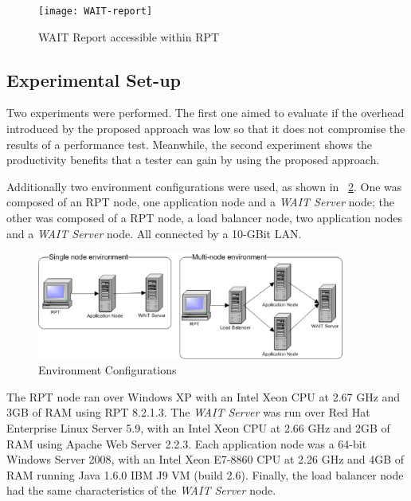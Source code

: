 \documentclass[runningheads,a4paper]{llncs}
\begin{document}

\begin{figure}[!h]
\centering
\texttt{[image: WAIT-report]}
\caption{WAIT Report accessible within RPT}
\label{fig_report}
\end{figure}

\vspace{-7pt}
\subsection{Experimental Set-up}
\vspace{-7pt}
Two experiments were performed. The first one aimed to evaluate if the overhead
introduced by the proposed approach was low so that it does not compromise the
results of a performance test. Meanwhile, the second experiment shows the
productivity benefits that a tester can gain by using the proposed approach.

Additionally two environment configurations were used, as shown in
\figurename ~\ref{fig_env}. One was composed of an RPT node, one application
node and a \emph{WAIT Server} node; the other was composed of a RPT node, a load
balancer node, two application nodes and a \emph{WAIT Server} node. All
connected by a 10-GBit LAN.

\begin{figure}[!h]
\centering
\includegraphics[totalheight=.15\textheight,width=0.9\textwidth]{Environments}
\caption{Environment Configurations}
\label{fig_env}
\end{figure}

The RPT node ran over Windows XP with an Intel Xeon CPU at
2.67 GHz and 3GB of RAM using RPT 8.2.1.3. The \emph{WAIT Server} was run over
Red Hat Enterprise Linux Server 5.9, with an Intel Xeon CPU at 2.66 GHz and 2GB of
RAM using Apache Web Server 2.2.3. Each application node was a 64-bit Windows
Server 2008, with an Intel Xeon E7-8860 CPU at 2.26 GHz and 4GB of RAM
running Java 1.6.0 IBM J9 VM (build 2.6). Finally, the load balancer node had
the same characteristics of the \emph{WAIT Server} node. 
\end{document}

